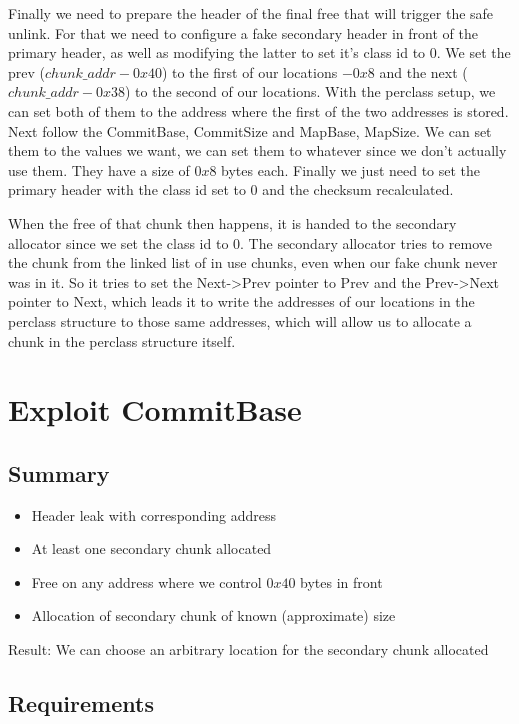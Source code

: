 \documentclass[a4paper,11pt,oneside]{report}
\begin{document}
Finally we need to prepare the header of the final free that will trigger the safe unlink. For that we need to configure a fake secondary header in front of the primary header, as well as modifying the latter to set it's class id to 0. We set the prev ($chunk\_addr - 0x40$) to the first of our locations $- 0x8$ and the next ($chunk\_addr - 0x38$) to the second of our locations. With the perclass setup, we can set both of them to the address where the first of the two addresses is stored.
Next follow the CommitBase, CommitSize and MapBase, MapSize. We can set them to the values we want, we can set them to whatever since we don't actually use them. They have a size of $0x8$ bytes each.
Finally we just need to set the primary header with the class id set to 0 and the checksum recalculated.

When the free of that chunk then happens, it is handed to the secondary allocator since we set the class id to 0. The secondary allocator tries to remove the chunk from the linked list of in use chunks, even when our fake chunk never was in it. So it tries to set the Next->Prev pointer to Prev and the Prev->Next pointer to Next, which leads it to write the addresses of our locations in the perclass structure to those same addresses, which will allow us to allocate a chunk in the perclass structure itself.



\section{Exploit CommitBase}

\subsection{Summary}

\begin{itemize}
  \item Header leak with corresponding address
  \item At least one secondary chunk allocated
  \item Free on any address where we control $0x40$ bytes in front
  \item Allocation of secondary chunk of known (approximate) size
\end{itemize}

Result:
We can choose an arbitrary location for the secondary chunk allocated

\subsection{Requirements}
\end{document}
